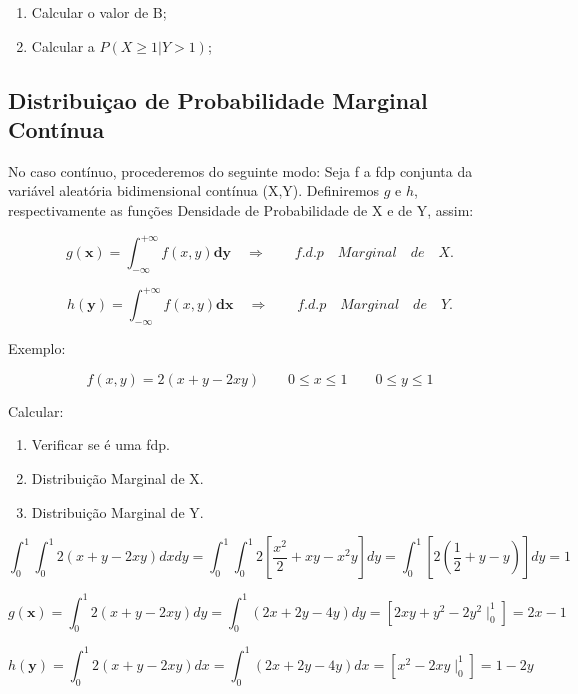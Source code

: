\documentclass[a4paper,12pt]{report}
\begin{document}
{\begin{enumerate}
    \item Calcular o valor de B;
    \item Calcular a $P(X\geq 1 | Y >1)$;
\end{enumerate}


\subsection{Distribuiçao de Probabilidade Marginal Contínua}

No caso contínuo, procederemos do seguinte modo: Seja f a fdp
conjunta da variável aleatória bidimensional contínua (X,Y).
Definiremos $g$ e $h$, respectivamente as funções Densidade de
Probabilidade de X e de Y, assim:

\begin{equation}\label{}
    g(\textbf{x})= \int^{+\infty}_{-\infty}f(x,y)\textbf{dy} \quad
    \Longrightarrow \quad \quad f.d.p \quad Marginal \quad de \quad X.
\end{equation}


\begin{equation}\label{}
    h(\textbf{y})= \int^{+\infty}_{-\infty}f(x,y)\textbf{dx} \quad
    \Longrightarrow \quad \quad f.d.p \quad Marginal \quad de \quad Y.
\end{equation}


Exemplo:



$$
f(x,y)= 2(x+y-2xy) \quad \quad 0\leq x \leq 1 \quad \quad 0\leq y
\leq 1
$$

Calcular:

\begin{enumerate}
    \item Verificar se é uma fdp.
    \item Distribuição Marginal de X.
    \item Distribuição Marginal de Y.
\end{enumerate}



$$
\int_{0}^{1}\int_{0}^{1}2(x+y-2xy)dxdy=
\int_{0}^{1}\int_{0}^{1}2\left[\frac{x^{2}}{2}+xy-x^{2}y\right]dy
= \int_{0}^{1}\left[2(\frac{1}{2}+y-y)\right]dy=1
$$


$$
g(\textbf{x})= \int^{1}_{0}2(x+y-2xy)dy = \int^{1}_{0}(2x+2y-4y)dy
= \left[2xy + y^{2}-2y^{2} \mid^{1}_{0}\right]=2x-1
$$

$$
h(\textbf{y})= \int^{1}_{0}2(x+y-2xy)dx = \int^{1}_{0}(2x+2y-4y)dx
= \left[x^{2}-2xy \mid^{1}_{0}\right]=1-2y
$$

}
\end{document}
